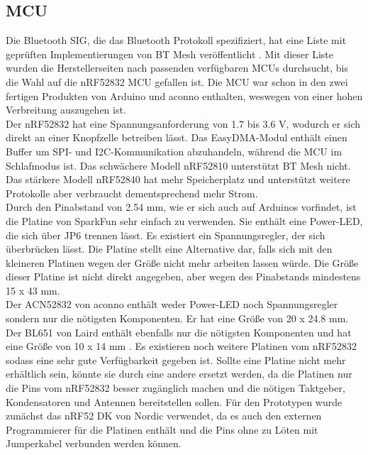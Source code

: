\subsection{MCU}
\label{ch:mcu}
Die Bluetooth SIG, die das Bluetooth Protokoll spezifiziert, hat eine Liste mit geprüften Implementierungen von BT Mesh veröffentlicht \cite{site_qualifiedMesh}.
Mit dieser Liste wurden die Herstellerseiten nach passenden verfügbaren MCUs durchsucht, bis die Wahl auf die nRF52832 MCU gefallen ist.
Die MCU war schon in den zwei fertigen Produkten von Arduino und aconno enthalten, weswegen von einer hohen Verbreitung auszugehen ist.\\
Der nRF52832 hat eine Spannungsanforderung von 1.7 bis 3.6 V, wodurch er sich direkt an einer Knopfzelle betreiben lässt.
Das EasyDMA-Modul enthält einen Buffer um SPI- und I2C-Kommunikation abzuhandeln, während die MCU im Schlafmodus ist.
Das schwächere Modell nRF52810 unterstützt BT Mesh nicht.
Das stärkere Modell nRF52840 hat mehr Speicherplatz und unterstützt weitere Protokolle aber verbraucht dementsprechend mehr Strom. \cite{site_nrfProducts}\\
Durch den Pinabstand von 2.54 mm, wie er sich auch auf Arduinos vorfindet, ist die Platine von SparkFun sehr einfach zu verwenden.
Sie enthält eine Power-LED, die sich über JP6 trennen lässt.
Es existiert ein Spannungsregler, der sich überbrücken lässt.
Die Platine stellt eine Alternative dar, falls sich mit den kleineren Platinen wegen der Größe nicht mehr arbeiten lassen würde.
Die Größe dieser Platine ist nicht direkt angegeben, aber wegen des Pinabstands mindestens 15 x 43 mm. \cite{datasheet_nrfSpark}\\
Der ACN52832 von aconno enthält weder Power-LED noch Spannungsregler sondern nur die nötigsten Komponenten.
Er hat eine Größe von 20 x 24.8 mm. \cite{datasheet_nrfAcn}\\
Der BL651 von Laird enthält ebenfalls nur die nötigsten Komponenten und hat eine Größe von 10 x 14 mm \cite{datasheet_nrfLaird}.
Es existieren noch weitere Platinen vom nRF52832 sodass eine sehr gute Verfügbarkeit gegeben ist.
Sollte eine Platine nicht mehr erhältlich sein, könnte sie durch eine andere ersetzt werden, da die Platinen nur die Pins vom nRF52832 besser zugänglich machen und die nötigen Taktgeber, Kondensatoren und Antennen bereitstellen sollen.
Für den Prototypen wurde zunächst das nRF52 DK von Nordic verwendet, da es auch den externen Programmierer für die Platinen enthält und die Pins ohne zu Löten mit Jumperkabel verbunden werden können.

